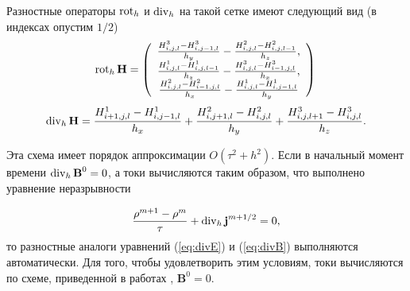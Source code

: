 Разностные операторы $\mathop{\mathrm{rot}}\nolimits_h$ и $\mathop{\mathrm{div}}\nolimits_h$ на такой сетке имеют следующий вид (в индексах опустим $1/2$)
\begin{equation}
\label{eq:rotdiv}
\mathop{\mathrm{rot}}\nolimits_h { \textbf{H}} =  \left(\begin{array}{c}  \frac{H^3_{i,j,l}-H^3_{i,j-1,l}}{h_y}-\frac{H^2_{i,j,l}-H^2_{i,j,l-1}}{h_z}, 
\\
\frac{H^1_{i,j,l}-H^1_{i,j,l-1}}{h_z}-\frac{H^3_{i,j,l}-H^3_{i-1,j,l}}{h_x},  
\\
\frac{H^2_{i,j,l}-H^2_{i-1,j,l}}{h_x}-\frac{H^1_{i,j,l}-H^1_{i,j-1,l}}{h_y} \end{array} \right) 
\\
\end{equation}
\begin{equation}
\mathop{\mathrm{div}}\nolimits_h { \textbf{H}} =  \frac{H^1_{i+1,j,l}-H^1_{i,j-1,l}}{h_x}+\frac{H^2_{i,j+1,l}-H^2_{i,j,l}}{h_y}+\frac{H^3_{i,j,l+1}-H^3_{i,j,l}}{h_z}. 
\end{equation}

Эта схема имеет порядок аппроксимации $O(\tau^2+h^2)$. Если в начальный момент времени $\mathop{\mathrm{div}}\nolimits_h{\textbf{B}}^0=0$, а токи вычисляются таким образом, что выполнено уравнение неразрывности 

\begin{equation}
\frac{\rho^{m+1}-\rho^m}{\tau}+\mathop{\mathrm{div}}\nolimits_h {\textbf{j}}^{m+1/2}=0,
\end{equation}
то разностные аналоги уравнений (\ref{eq:divE}) и (\ref{eq:divB}) выполняются автоматически.
Для того, чтобы удовлетворить этим условиям, токи вычисляются по схеме, приведенной в работах \cite{VshivkovPICbook, laser}, ${\textbf{B}}^0=0$. 

